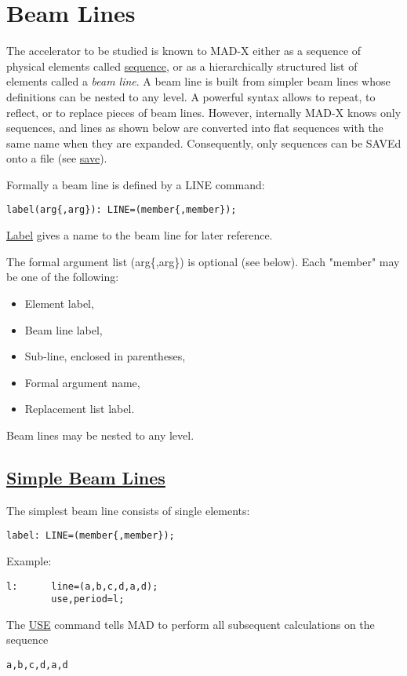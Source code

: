 

\chapter{Beam Lines}

The accelerator to be studied is known to MAD-X either as a sequence of
physical elements called \href{sequence.html}{sequence}, or as a
hierarchically structured list of elements called a \emph{beam line}. A
beam line is built from simpler beam lines whose definitions can be
nested to any level. A powerful syntax allows to repeat, to reflect, or
to replace pieces of beam lines. However, internally MAD-X knows only
sequences, and lines as shown below are converted into flat sequences
with the same name when they are expanded. Consequently, only sequences
can be SAVEd onto a file (see
\href{../control/general.html#save}{save}).  

Formally a beam line is defined by a LINE command: 
\begin{verbatim}
label(arg{,arg}): LINE=(member{,member});
\end{verbatim}
\href{label.html}{Label} gives a name to the beam line for later reference. 

The formal argument list (arg\{,arg\}) is optional (see below). Each
"member" may be one of the following:  
\begin{itemize}
	\item  Element label, 
	\item  Beam line label, 
	\item  Sub-line, enclosed in parentheses, 
	\item  Formal argument name, 
	\item  Replacement list label. 
\end{itemize} 
Beam lines may be nested to any level.  

\section{\href{simple}{Simple Beam Lines}} 
The simplest beam line consists of single elements: 
\begin{verbatim}
label: LINE=(member{,member});
\end{verbatim} 
Example: 
\begin{verbatim}
l:      line=(a,b,c,d,a,d);
        use,period=l;
\end{verbatim} 
The \href{../control/general.html#use}{USE} command tells MAD to perform
all subsequent calculations on the sequence  
\begin{verbatim}
a,b,c,d,a,d
\end{verbatim}

